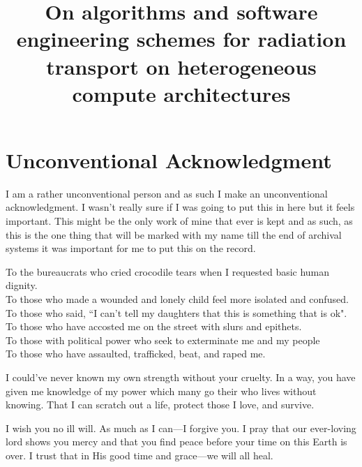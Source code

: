 \documentclass[onehalf,11pt]{beavtex/beavtex}
\title{On algorithms and software engineering schemes for radiation transport on heterogeneous compute architectures}
\author{\TheAuthors{}}
\begin{document}
\maketitle

\mainmatter










\newpage


\printbibliography[]

\chapter*{Unconventional Acknowledgment}
I am a rather unconventional person and as such I make an unconventional acknowledgment.
I wasn't really sure if I was going to put this in here but it feels important.
This might be the only work of mine that ever is kept and as such, as this is the one thing that will be marked with my name till the end of archival systems it was important for me to put this on the record.

To the bureaucrats who cried crocodile tears when I requested basic human dignity.\\
To those who made a wounded and lonely child feel more isolated and confused.\\
To those who said, ``I can't tell my daughters that this is something that is ok".\\
To those who have accosted me on the street with slurs and epithets.\\
To those with political power who seek to exterminate me and my people\\
To those who have assaulted, trafficked, beat, and raped me.

I could've never known my own strength without your cruelty.
In a way, you have given me knowledge of my power which many go their who lives without knowing.
That I can scratch out a life, protect those I love, and survive.

I wish you no ill will.
As much as I can---I forgive you.
I pray that our ever-loving lord shows you mercy and that you find peace before your time on this Earth is over.
I trust that in His good time and grace---we will all heal.


%
\end{document}
